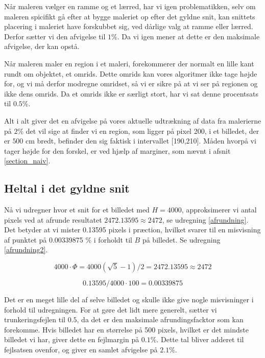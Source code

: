 Når maleren vælger en ramme og et lærred, har vi igen problematikken,
selv om maleren spicifikt gå efter at bygge maleriet op efter det gyldne
snit, kan snittets placering i maleriet have forskubbet sig, ved dårlige
valg at ramme eller lærred. Derfor sætter vi den afvigelse til $1\%$. Da
vi igen mener at dette er den maksimale afvigelse, der kan opstå.

Når maleren maler en region i et maleri, forekommerer der normalt en
lille kant rundt om objektet, et omrids. Dette omrids kan vores
algoritmer ikke tage højde for, og vi må derfor modregne omridset, så vi
er sikre på at vi ser på regionen og ikke dens omrids. Da et omrids ikke
er særligt stort, har vi sat denne procentsats til $0.5\%$. 

Alt i alt giver det en afvigelse på vores aktuelle udtrækning af data
fra malerierne på $2\%$ det vil sige at finder vi en region, som ligger
på pixel 200, i et billedet, der er $500$ cm bredt, befinder den sig
faktisk i intervallet [190,210]. Måden hvorpå vi tager højde for den
forskel, er ved hjælp af marginer, som nævnt i afsnit
\ref{section_naiv}.


\subsection{Heltal i det gyldne snit}
Nå vi udregner hvor et snit for et billedet med $H = 4000$,
approksimerer vi antal pixels ved at afrunde resultatet $2472.13595
\approx 2472$, se udregning \ref{afrundning}. Det betyder at vi mister
0.13595 pixels i præction, hvilket svarer til en misvisning af punktet
på 0.00339875 $\%$ i forholdt til $B$ på billedet. Se udregning
\ref{afrundning2}.

\begin{equation}
	4000 \cdot \varPhi = 4000(\sqrt{5}-1)/2 = 2472.13595 \approx 2472 \label{afrundning}
\end{equation}

\begin{equation}
	0.13595/4000 \cdot 100 = 0.00339875 \label{afrundning2}
\end{equation}

Det er en meget lille del af selve billedet og skulle ikke give nogle
misvisninger i forhold til udregningen. For at gøre det lidt mere
generelt, sætter vi trunkeringsfejlen til $0.5$, da det er den maksimale
afrundingsfacktor som kan forekomme. Hvis billedet har en størrelse på
500 pixels, hvilket er det mindste billedet vi har, giver dette en fejlmargin
på $0.1 \%$. Dette tal bliver adderet til fejlsatsen ovenfor, og giver
en samlet afvigelse på $2.1\%$.



